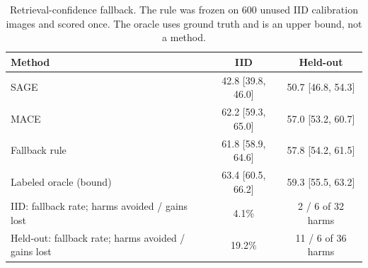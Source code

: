 \begin{table}[t]
\centering\small
\caption{Retrieval-confidence fallback. The rule was frozen on 600 unused IID calibration images and scored once. The oracle uses ground truth and is an upper bound, not a method.}
\label{tab:table_C_fallback}
\begin{tabular}{lcc}
\toprule
Method & IID & Held-out \\
\midrule
SAGE & 42.8 [39.8, 46.0] & 50.7 [46.8, 54.3] \\
MACE & 62.2 [59.3, 65.0] & 57.0 [53.2, 60.7] \\
Fallback rule & 61.8 [58.9, 64.6] & 57.8 [54.2, 61.5] \\
Labeled oracle (bound) & 63.4 [60.5, 66.2] & 59.3 [55.5, 63.2] \\
IID: fallback rate; harms avoided / gains lost & 4.1\% & 2 / 6 of 32 harms \\
Held-out: fallback rate; harms avoided / gains lost & 19.2\% & 11 / 6 of 36 harms \\
\bottomrule
\end{tabular}
\end{table}
